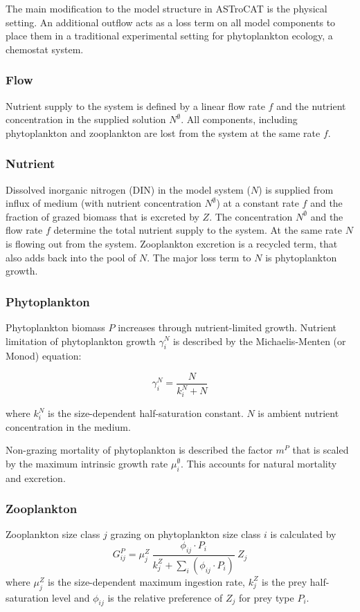 \documentclass[journal abbreviations, manuscript]{copernicus}
\begin{document}
The main modification to the model structure in ASTroCAT is the physical setting. An additional outflow acts as a loss term on all model components to place them in a traditional experimental setting for phytoplankton ecology, a chemostat system.

\subsubsection{Flow}

Nutrient supply to the system is defined by a linear flow rate $f$ and the nutrient concentration in the supplied solution $N^\emptyset$. All components, including phytoplankton and zooplankton are lost from the system at the same rate $f$.

\subsubsection{Nutrient}
Dissolved inorganic nitrogen (DIN) in the model system ($N$) is supplied from influx of medium (with nutrient concentration $N^\emptyset$) at a constant rate $f$ and the fraction of grazed biomass that is excreted by $Z$. The concentration $N^\emptyset$ and the flow rate $f$ determine the total nutrient supply to the system. At the same rate $N$ is flowing out from the system. Zooplankton excretion is a recycled term, that also adds back into the pool of $N$. The major loss term to $N$ is phytoplankton growth.

\subsubsection{Phytoplankton}
Phytoplankton biomass $P$ increases through  nutrient-limited growth. Nutrient limitation of phytoplankton growth $\gamma_i^N$ is described by the Michaelis-Menten (or Monod) equation:

\begin{equation}
    \gamma_i^N =  \frac{N}{k_i^N + N} 
\end{equation}

where $k_i^N$ is the size-dependent half-saturation constant. $N$ is ambient nutrient concentration in the medium.

Non-grazing mortality of phytoplankton is described the factor $m^P$ that is scaled by the maximum intrinsic growth rate $\mu_i^{\emptyset}$. This accounts for natural mortality and excretion.

\subsubsection{Zooplankton}
Zooplankton size class $j$ grazing on phytoplankton size class $i$ is calculated by
\begin{equation}
    G_{ij}^P = \mu_j^Z \ \frac{ \phi_{ij} \cdot P_i }{ k_j^Z + \sum_{i}(\phi_{ij} \cdot P_i) } \ Z_j
\end{equation}
where $\mu_j^Z$ is the size-dependent maximum ingestion rate, $k_j^Z$ is the prey half-saturation level and $\phi_{ij}$ is the relative preference of $Z_j$ for prey type $P_i$.
\end{document}
